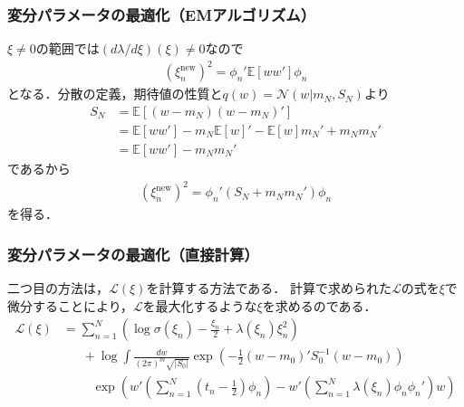 \documentclass[10pt,usepdftitle=false,hyperref={unicode}]{beamer}
\newcommand{\absolute}[1]{\left|#1\right|}
\newcommand{\parentheses}[1]{\left(#1\right)}
\newcommand{\brackets}[1]{\left[#1\right]}
\newcommand{\energy}{\mathcal{L}}
\begin{document}
\begin{frame}
\frametitle{変分パラメータの最適化（EMアルゴリズム）}
$\xi \neq 0$の範囲では$\parentheses{d\lambda/d\xi}\parentheses{\xi} \neq 0$なので
\begin{align*}
    \parentheses{\xi_n^{\mathrm{new}}}^2 = \phi_n'\mathbb{E}\brackets{ww'}\phi_n
\end{align*}
となる．分散の定義，期待値の性質と$q\parentheses{w} = \mathcal{N}\parentheses{w|m_N,S_N}$より
\begin{align*}
    S_N &= \mathbb{E}\brackets{\parentheses{w - m_N}\parentheses{w - m_N}'} \\
        &= \mathbb{E}\brackets{ww'} - m_N\mathbb{E}\brackets{w}' - \mathbb{E}\brackets{w}m_N' + m_N m_N' \\
        &= \mathbb{E}\brackets{ww'} - m_N m_N'
\end{align*}
であるから
\begin{align}
    \parentheses{\xi_n^{\mathrm{new}}}^2 = \phi_n'\parentheses{S_N + m_N m_N'}\phi_n \tag{10.163}
\end{align}
を得る．
\end{frame}

\begin{frame}
\frametitle{変分パラメータの最適化（直接計算）}
二つ目の方法は，$\energy\parentheses{\xi}$を計算する方法である．
計算で求められた$\energy$の式を$\xi$で微分することにより，$\energy$を最大化するような$\xi$を求めるのである．
\begin{align*}
    \energy\parentheses{\xi}
    &= \sum_{n = 1}^N
        \parentheses{%
            \log\sigma\parentheses{\xi_n}
            - \frac{\xi_n}{2}
            + \lambda\parentheses{\xi_n}\xi_n^2
        } \\
    &\phantom{=}\ +\log \int
        \frac{dw}{\parentheses{%
            2\pi}^m\sqrt{\absolute{S_0}}
        }
        \exp\parentheses{%
            -\frac{1}{2}\parentheses{w - m_0}' S_0^{-1} \parentheses{w - m_0}
        }\\
    &\phantom{=+}\ \exp\parentheses{%
            w'\parentheses{%
                \sum_{n = 1}^N \parentheses{t_n - \frac{1}{2}}\phi_n
            }
            -w'\parentheses{%
                \sum_{n = 1}^N \lambda\parentheses{\xi_n}\phi_n\phi_n'
            }w
        }
\end{align*}
\end{frame}
\end{document}
